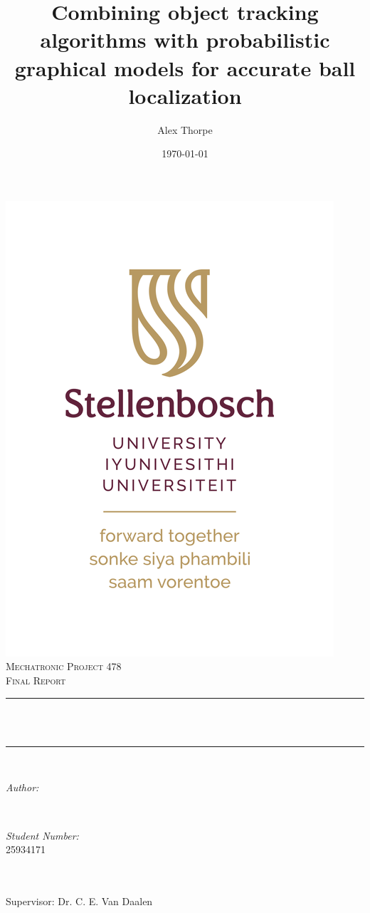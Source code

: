 \documentclass[12pt,a4paper]{article}
\title{\textbf{Combining object tracking algorithms with probabilistic graphical models for accurate ball localization}}
\author{Alex Thorpe \textsc{}} %
\date{\today} %
\makeatletter
\let\thetitle\@title
\let\theauthor\@author
\let\thedate\@date
\makeatother
\begin{document}
	\begin{titlepage}
	\centering
	\includegraphics[scale = 1.5]{SU_logo_RGB-01.png}\\[1.0 cm]   %
	\textsc{\LARGE Mechatronic Project 478\\Final Report}\\[0.5 cm]               
	\rule{0.9\textwidth}{0.2 mm} \\[0.4 cm]
	{ \huge \bfseries \thetitle }\\[0.4 cm]
	\rule{0.9\textwidth}{0.2 mm} \\[1.5 cm]
	
	\begin{minipage}{6.5cm}
		\begin{flushleft} \large
			\emph{Author:}\\
			\theauthor
		\end{flushleft}
	\end{minipage}~
	\begin{minipage}{6.5cm}
		\begin{flushright} \large
			\emph{Student Number:} \\
			{25934171}
		\end{flushright}
	\end{minipage}\\[2 cm]
	{\large \thedate}\\[1 cm]
	{\large Supervisor: Dr. C. E. Van Daalen}\\[1 cm]
	\vfill
	
\end{titlepage}
\end{document}
